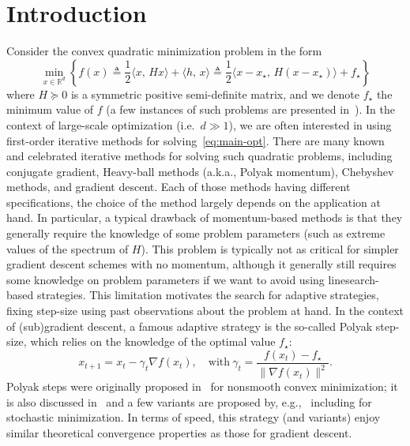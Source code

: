 \documentclass{article}
\newcommand{\xs}{x_\star}
\begin{document}
\section{Introduction}\label{sec:introduction}
    Consider the convex quadratic minimization problem in the form
    \begin{equation}
        \min_{x\in\mathbb{R}^d} \left\{f(x)\triangleq \frac{1}{2} \langle x,\, H x \rangle + \langle h,\, x \rangle \triangleq \frac{1}{2} \langle x-\xs,\, H (x-\xs)\rangle + f_\star\right\} \label{eq:main-opt}
    \end{equation}
    where $H\succcurlyeq 0$ is a symmetric positive semi-definite matrix, and we denote $f_\star$ the minimum value of $f$ (a few instances of such problems are presented in~).
    In the context of large-scale optimization (i.e.\ $d\gg 1$), we are often interested in using first-order iterative methods for solving~\cref{eq:main-opt}.
    There are many known and celebrated iterative methods for solving such quadratic problems, including conjugate gradient, Heavy-ball methods (a.k.a., Polyak momentum), Chebyshev methods, and gradient descent.
    Each of those methods having different specifications, the choice of the method largely depends on the application at hand.
    In particular, a typical drawback of momentum-based methods is that they generally require the knowledge of some problem parameters (such as extreme values of the spectrum of $H$).
    This problem is typically not as critical for simpler gradient descent schemes with no momentum, although it generally still requires some knowledge on problem parameters if we want to avoid using linesearch-based strategies.
    This limitation motivates the search for adaptive strategies, fixing step-size using past observations about the problem at hand.
    In the context of (sub)gradient descent, a famous adaptive strategy is the so-called Polyak step-size, which relies on the knowledge of the optimal value  $f_\star$:
    \begin{equation}\label{eq:PolyakStep}
         x_{t+1} = x_t - \gamma_t \nabla f(x_t), \quad \text{with} \ \gamma_t = \frac{f(x_t) - f_\star}{\|\nabla f(x_t)\|^2}.
    \end{equation}
    Polyak steps were originally proposed in~\citet{polyakintroduction} for nonsmooth convex minimization;
    it is also discussed in~\citet{boyd2003subgradient} and a few variants are proposed by, e.g.,~\cite{barre2020complexity,loizou2021stochastic,gower2022cutting} including for stochastic minimization.
    In terms of speed, this strategy (and variants) enjoy similar theoretical convergence properties as those for gradient descent.
\end{document}
